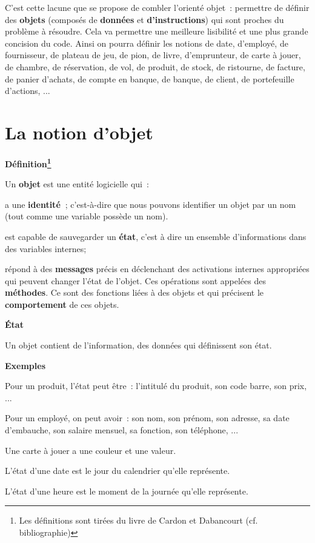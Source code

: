 	C'est cette lacune que se propose de combler
	l'orienté objet~: permettre de définir des
	\textbf{objets} (composés de \textbf{données} et
	\textbf{d'instructions}) qui sont proches du problème
	à résoudre. Cela va permettre une meilleure lisibilité et une plus
	grande concision du code. Ainsi on pourra définir les notions de date,
	d'employé, de fournisseur, de plateau de jeu, de pion,
	de livre, d'emprunteur, de carte à jouer, de chambre,
	de réservation, de vol, de produit, de stock, de ristourne, de facture,
	de panier d'achats, de compte en banque, de banque, de
	client, de portefeuille d'actions, ...


\section{La notion d'objet}

{\sffamily\bfseries\upshape
Définition\footnote{Les définitions sont tirées du livre de Cardon et
Dabancourt (cf. bibliographie)}}

Un \textbf{objet} est une entité logicielle qui~:

\begin{liste}
	\item 
		a une \textbf{identité~}; c'est-à-dire que nous pouvons
		identifier un objet par un nom (tout comme une variable possède un
		nom).
	\item 
		est capable de sauvegarder un \textbf{état}, c'est à
		dire un ensemble d'informations dans des variables
		internes;
	\item 
		répond à des \textbf{messages} précis en déclenchant des activations
		internes appropriées qui peuvent changer l'état de
		l'objet. Ces opérations sont appelées des
		\textbf{méthodes}. Ce sont des fonctions liées à des objets et qui
		précisent le \textbf{comportement} de ces objets.
\end{liste}

{\sffamily\bfseries\upshape
État}

Un objet contient de l'information, des données qui
définissent son état.

{\bfseries
Exemples}

\begin{liste}
	\item 
		Pour un produit, l'état peut être~:
		l'intitulé du produit, son code barre, son prix, ... 
	\item 
		Pour un employé, on peut avoir~: son nom, son prénom, son adresse, sa
		date d'embauche, son salaire mensuel, sa fonction, son
		téléphone, ... 
	\item 
		Une carte à jouer a une couleur et une valeur.
	\item 
		L'état d'une date est le jour du
		calendrier qu'elle représente.
	\item 
		L'état d'une heure est le moment de la
		journée qu'elle représente.
\end{liste}


